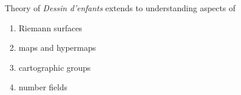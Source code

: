 \documentclass{beamer}
\begin{document}

    

\begin{frame}{}
    Theory of \emph{Dessin d'enfants} extends to understanding aspects of
    \begin{enumerate}
        \item Riemann surfaces
        \item maps and hypermaps 
        \item cartographic groups
        \item number fields
    \end{enumerate}
\end{frame}

        
\end{document}
